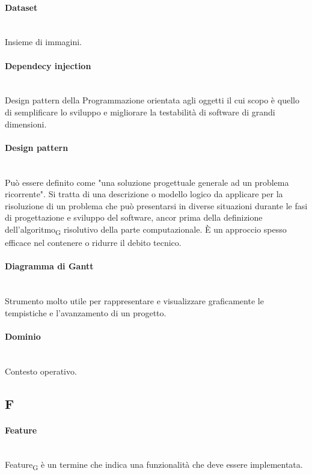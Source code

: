 \paragraph{Dataset}~\smallskip \\
Insieme di immagini.

\paragraph{Dependecy injection}~\smallskip \\
Design pattern della Programmazione orientata agli oggetti il cui scopo è quello di semplificare lo sviluppo e migliorare la testabilità di software di grandi dimensioni.

\paragraph{Design pattern}~\smallskip \\
Può essere definito come "una soluzione progettuale generale ad un problema ricorrente".
Si tratta di una descrizione o modello logico da applicare per la risoluzione di un problema che può 
presentarsi in diverse situazioni durante le fasi di progettazione e sviluppo del software, ancor prima della definizione 
dell'algoritmo\textsubscript{G} risolutivo della parte computazionale. È un approccio spesso efficace nel contenere o ridurre il debito tecnico.

\paragraph{Diagramma di Gantt}~\smallskip \\
Strumento molto utile per rappresentare e visualizzare graficamente le tempistiche e l'avanzamento di un progetto.

\paragraph{Dominio}~\smallskip \\
Contesto operativo.

\newpage
{}
\subsection*{F}

\paragraph{Feature}~\smallskip \\
Feature\textsubscript{G} è un termine che indica una funzionalità che deve essere implementata.

